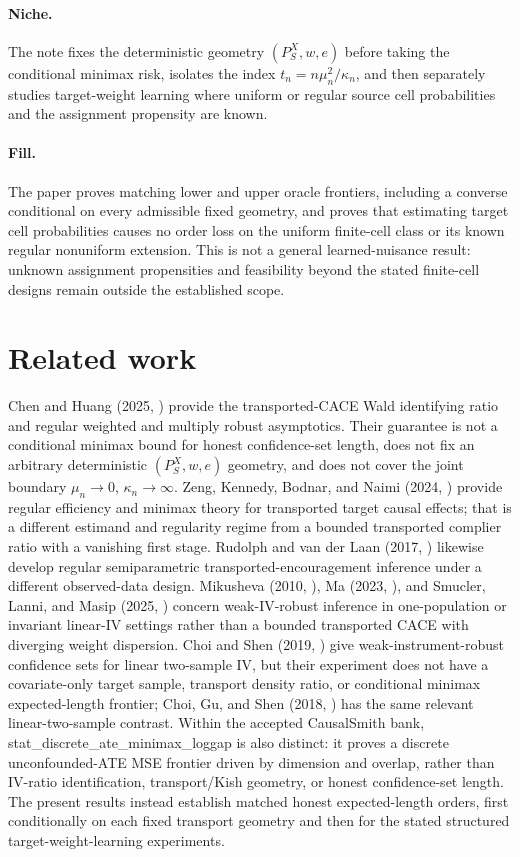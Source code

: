 \documentclass{article}
\begin{document}
\paragraph{Niche.} The note fixes the deterministic geometry \((P_S^X,w,e)\) before taking the conditional minimax risk, isolates the index \(t_n=n\mu_n^2/\kappa_n\), and then separately studies target-weight learning where uniform or regular source cell probabilities and the assignment propensity are known.

\paragraph{Fill.} The paper proves matching lower and upper oracle frontiers, including a converse conditional on every admissible fixed geometry, and proves that estimating target cell probabilities causes no order loss on the uniform finite-cell class or its known regular nonuniform extension. This is not a general learned-nuisance result: unknown assignment propensities and feasibility beyond the stated finite-cell designs remain outside the established scope.

\section{Related work}

Chen and Huang (2025, \cite{ChenHuang2025}) provide the transported-CACE Wald identifying ratio and regular weighted and multiply robust asymptotics. Their guarantee is not a conditional minimax bound for honest confidence-set length, does not fix an arbitrary deterministic \((P_S^X,w,e)\) geometry, and does not cover the joint boundary \(\mu_n\to0\), \(\kappa_n\to\infty\). Zeng, Kennedy, Bodnar, and Naimi (2024, \cite{ZengKennedyBodnarNaimi2024}) provide regular efficiency and minimax theory for transported target causal effects; that is a different estimand and regularity regime from a bounded transported complier ratio with a vanishing first stage. Rudolph and van der Laan (2017, \cite{RudolphVanderLaan2017}) likewise develop regular semiparametric transported-encouragement inference under a different observed-data design. Mikusheva (2010, \cite{Mikusheva2010}), Ma (2023, \cite{Ma2023}), and Smucler, Lanni, and Masip (2025, \cite{SmuclerLanniMasip2025}) concern weak-IV-robust inference in one-population or invariant linear-IV settings rather than a bounded transported CACE with diverging weight dispersion. Choi and Shen (2019, \cite{ChoiShen2019}) give weak-instrument-robust confidence sets for linear two-sample IV, but their experiment does not have a covariate-only target sample, transport density ratio, or conditional minimax expected-length frontier; Choi, Gu, and Shen (2018, \cite{ChoiGuShen2018}) has the same relevant linear-two-sample contrast. Within the accepted CausalSmith bank, stat\_discrete\_ate\_minimax\_loggap is also distinct: it proves a discrete unconfounded-ATE MSE frontier driven by dimension and overlap, rather than IV-ratio identification, transport/Kish geometry, or honest confidence-set length. The present results instead establish matched honest expected-length orders, first conditionally on each fixed transport geometry and then for the stated structured target-weight-learning experiments.
\end{document}
